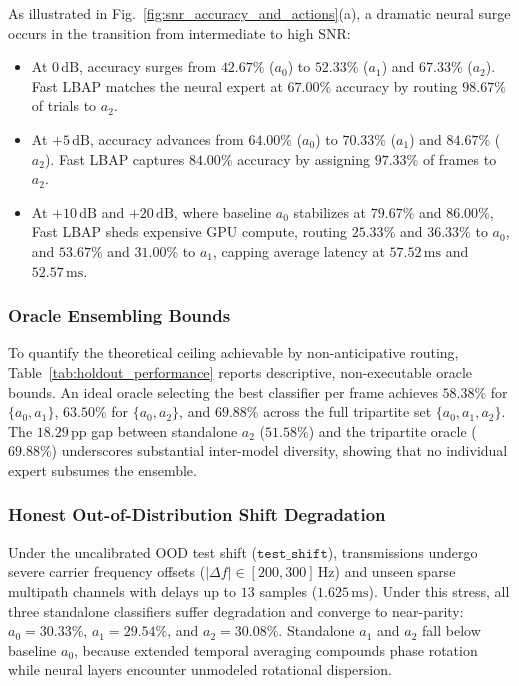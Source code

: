 As illustrated in Fig.~\ref{fig:snr_accuracy_and_actions}(a), a dramatic neural surge occurs in the transition from intermediate to high SNR:
\begin{itemize}
    \item At $0\,\mathrm{dB}$, accuracy surges from $42.67\%$ ($a_0$) to $52.33\%$ ($a_1$) and $67.33\%$ ($a_2$). Fast LBAP matches the neural expert at $67.00\%$ accuracy by routing $98.67\%$ of trials to $a_2$.
    \item At $+5\,\mathrm{dB}$, accuracy advances from $64.00\%$ ($a_0$) to $70.33\%$ ($a_1$) and $84.67\%$ ($a_2$). Fast LBAP captures $84.00\%$ accuracy by assigning $97.33\%$ of frames to $a_2$.
    \item At $+10\,\mathrm{dB}$ and $+20\,\mathrm{dB}$, where baseline $a_0$ stabilizes at $79.67\%$ and $86.00\%$, Fast LBAP sheds expensive GPU compute, routing $25.33\%$ and $36.33\%$ to $a_0$, and $53.67\%$ and $31.00\%$ to $a_1$, capping average latency at $57.52\,\mathrm{ms}$ and $52.57\,\mathrm{ms}$.
\end{itemize}

\subsubsection{Oracle Ensembling Bounds}
To quantify the theoretical ceiling achievable by non-anticipative routing, Table~\ref{tab:holdout_performance} reports descriptive, non-executable oracle bounds. An ideal oracle selecting the best classifier per frame achieves $58.38\%$ for $\{a_0, a_1\}$, $63.50\%$ for $\{a_0, a_2\}$, and $69.88\%$ across the full tripartite set $\{a_0, a_1, a_2\}$. The $18.29\,\mathrm{pp}$ gap between standalone $a_2$ ($51.58\%$) and the tripartite oracle ($69.88\%$) underscores substantial inter-model diversity, showing that no individual expert subsumes the ensemble.

\subsubsection{Honest Out-of-Distribution Shift Degradation}
Under the uncalibrated OOD test shift ($\texttt{test\_shift}$), transmissions undergo severe carrier frequency offsets ($|\Delta f| \in [200, 300]\,\mathrm{Hz}$) and unseen sparse multipath channels with delays up to $13$ samples ($1.625\,\mathrm{ms}$). Under this stress, all three standalone classifiers suffer degradation and converge to near-parity: $a_0 = 30.33\%$, $a_1 = 29.54\%$, and $a_2 = 30.08\%$. Standalone $a_1$ and $a_2$ fall below baseline $a_0$, because extended temporal averaging compounds phase rotation while neural layers encounter unmodeled rotational dispersion.

